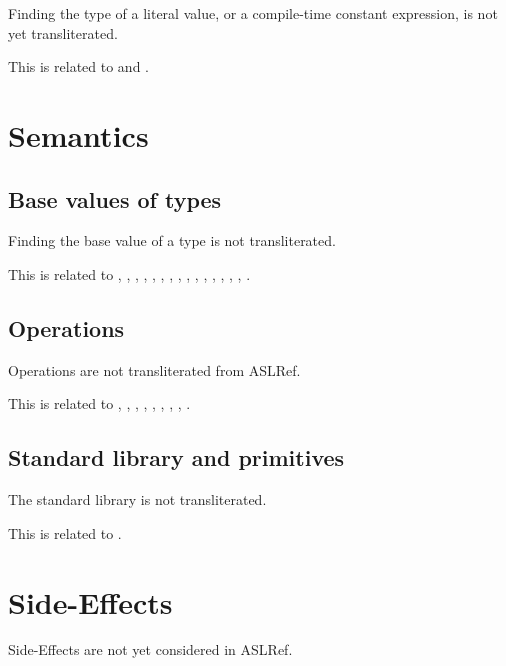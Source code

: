 \documentclass{book}
\begin{document}
Finding the type of a literal value, or a compile-time constant expression, is
not yet transliterated.

This is related to  and .

\section{Semantics}

\subsection{Base values of types}

Finding the base value of a type is not transliterated.

This is related to , , , ,
, , , , ,
, , , , ,
, .

\subsection{Operations}

Operations are not transliterated from ASLRef.

This is related to , , , ,
, , , , .

\subsection{Standard library and primitives}

The standard library is not transliterated.

This is related to .

\section{Side-Effects}

Side-Effects are not yet considered in ASLRef.
\end{document}
